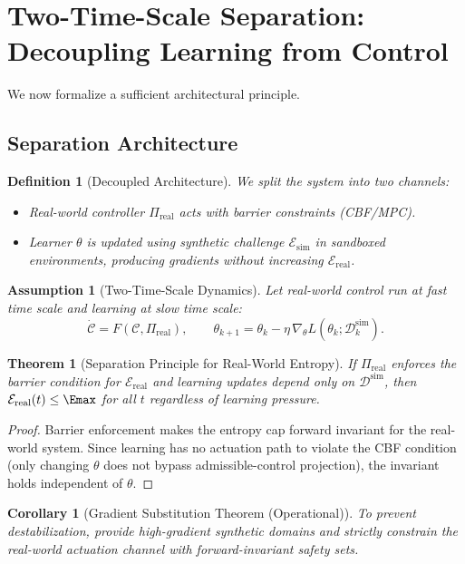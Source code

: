 \documentclass[11pt]{article}
\newtheorem{definition}{Definition}
\newtheorem{assumption}{Assumption}
\newtheorem{theorem}{Theorem}
\newtheorem{corollary}{Corollary}
\newcommand{\Eenv}{\mathcal{E}}     %
\newcommand{\Civ}{\mathcal{C}}      %
\begin{document}
\section{Two-Time-Scale Separation: Decoupling Learning from Control}

We now formalize a sufficient architectural principle.

\subsection{Separation Architecture}

\begin{definition}[Decoupled Architecture]
We split the system into two channels:
\begin{itemize}
\item Real-world controller $\Pi_{\mathrm{real}}$ acts with barrier constraints (CBF/MPC).
\item Learner $\theta$ is updated using \emph{synthetic challenge} $\Eenv_{\mathrm{sim}}$ in sandboxed environments, producing gradients without increasing $\Eenv_{\mathrm{real}}$.
\end{itemize}
\end{definition}

\begin{assumption}[Two-Time-Scale Dynamics]
Let real-world control run at fast time scale and learning at slow time scale:
\[
\dot{\Civ} = F(\Civ,\Pi_{\mathrm{real}}),\qquad
\theta_{k+1}=\theta_k-\eta\,\nabla_\theta L(\theta_k;\mathcal{D}^{\mathrm{sim}}_k).
\]
\end{assumption}

\begin{theorem}[Separation Principle for Real-World Entropy]
If $\Pi_{\mathrm{real}}$ enforces the barrier condition for $\Eenv_{\mathrm{real}}$ and learning updates depend only on $\mathcal{D}^{\mathrm{sim}}$, then $\Eenv_{\mathrm{real}}(t)\le \Emax$ for all $t$ regardless of learning pressure.
\end{theorem}

\begin{proof}
Barrier enforcement makes the entropy cap forward invariant for the real-world system. Since learning has no actuation path to violate the CBF condition (only changing $\theta$ does not bypass admissible-control projection), the invariant holds independent of $\theta$.
\end{proof}

\begin{corollary}[Gradient Substitution Theorem (Operational)]
To prevent destabilization, provide high-gradient synthetic domains and strictly constrain the real-world actuation channel with forward-invariant safety sets.
\end{corollary}
\end{document}
